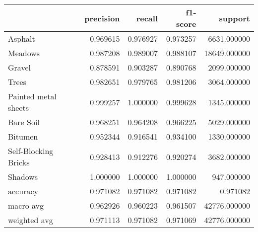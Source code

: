 \begin{tabular}{lrrrr}
\toprule
{} &  precision &    recall &  f1-score &       support \\
\midrule
Asphalt              &   0.969615 &  0.976927 &  0.973257 &   6631.000000 \\
Meadows              &   0.987208 &  0.989007 &  0.988107 &  18649.000000 \\
Gravel               &   0.878591 &  0.903287 &  0.890768 &   2099.000000 \\
Trees                &   0.982651 &  0.979765 &  0.981206 &   3064.000000 \\
Painted metal sheets &   0.999257 &  1.000000 &  0.999628 &   1345.000000 \\
Bare Soil            &   0.968251 &  0.964208 &  0.966225 &   5029.000000 \\
Bitumen              &   0.952344 &  0.916541 &  0.934100 &   1330.000000 \\
Self-Blocking Bricks &   0.928413 &  0.912276 &  0.920274 &   3682.000000 \\
Shadows              &   1.000000 &  1.000000 &  1.000000 &    947.000000 \\
accuracy             &   0.971082 &  0.971082 &  0.971082 &      0.971082 \\
macro avg            &   0.962926 &  0.960223 &  0.961507 &  42776.000000 \\
weighted avg         &   0.971113 &  0.971082 &  0.971069 &  42776.000000 \\
\bottomrule
\end{tabular}
